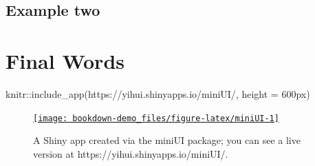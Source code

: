 \documentclass[
]{book}
\newenvironment{Shaded}{\begin{snugshade}}{\end{snugshade}}
\newcommand{\AttributeTok}[1]{\textcolor[rgb]{0.77,0.63,0.00}{#1}}
\newcommand{\FunctionTok}[1]{\textcolor[rgb]{0.00,0.00,0.00}{#1}}
\newcommand{\NormalTok}[1]{#1}
\newcommand{\SpecialCharTok}[1]{\textcolor[rgb]{0.00,0.00,0.00}{#1}}
\newcommand{\StringTok}[1]{\textcolor[rgb]{0.31,0.60,0.02}{#1}}
\begin{document}
\hypertarget{example-two}{%
\section{Example two}\label{example-two}}

\hypertarget{final-words}{%
\chapter{Final Words}\label{final-words}}

\begin{Shaded}
\begin{Highlighting}[]
\NormalTok{knitr}\SpecialCharTok{::}\FunctionTok{include\_app}\NormalTok{(}\StringTok{\textquotesingle{}https://yihui.shinyapps.io/miniUI/\textquotesingle{}}\NormalTok{, }\AttributeTok{height =} \StringTok{\textquotesingle{}600px\textquotesingle{}}\NormalTok{)}
\end{Highlighting}
\end{Shaded}

\begin{figure}

{\centering \href{https://yihui.shinyapps.io/miniUI/}{\texttt{[image: bookdown-demo\_files/figure-latex/miniUI-1]} }

}

\caption{A Shiny app created via the miniUI package; you can see a live version at https://yihui.shinyapps.io/miniUI/.}\label{fig:miniUI}
\end{figure}

  
\end{document}
